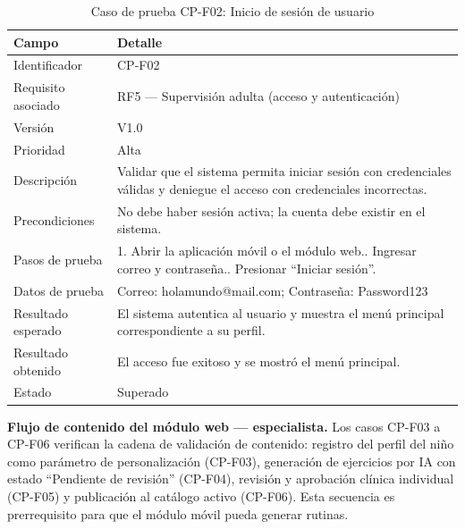 				\begin{table}[H]
					\centering\small
					\caption{Caso de prueba CP-F02: Inicio de sesión de usuario}
					\label{tab:cpf02}
					\begin{tabular}{p{3cm}p{12.0cm}}
						\hline
						\textbf{Campo} & \textbf{Detalle}\\
						\hline
						Identificador & CP-F02\\
						Requisito asociado & RF5 --- Supervisión adulta (acceso y autenticación)\\
						Versión & V1.0\\
						Prioridad & Alta\\
						Descripción & Validar que el sistema permita iniciar sesión con credenciales válidas y deniegue el acceso con credenciales incorrectas.\\
						Precondiciones & No debe haber sesión activa; la cuenta debe existir en el sistema.\\
						Pasos de prueba & 1. Abrir la aplicación móvil o el módulo web.\newline 2. Ingresar correo y contraseña.\newline 3. Presionar ``Iniciar sesión''.\\
						Datos de prueba & Correo: holamundo@mail.com; Contraseña: Password123\\
						Resultado esperado & El sistema autentica al usuario y muestra el menú principal correspondiente a su perfil.\\
						Resultado obtenido & El acceso fue exitoso y se mostró el menú principal.\\
						Estado & Superado\\
						\hline
					\end{tabular}
				\end{table}
				\tblnote
				
				\textbf{Flujo de contenido del módulo web --- especialista.} Los casos CP-F03 a CP-F06 verifican la cadena de validación de contenido: registro del perfil del niño como parámetro de personalización (CP-F03), generación de ejercicios por IA con estado ``Pendiente de revisión'' (CP-F04), revisión y aprobación clínica individual (CP-F05) y publicación al catálogo activo (CP-F06). Esta secuencia es prerrequisito para que el módulo móvil pueda generar rutinas.
								
